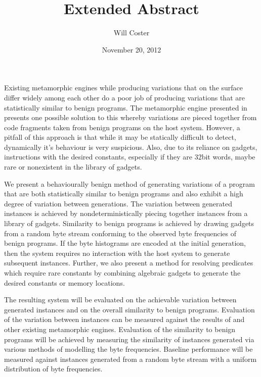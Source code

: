 \documentclass[finalcopy,short]{srpaper}
\title{Extended Abstract}
\author{Will Coster}
\date{November 20, 2012}
\begin{document}
  \frontmatter

  Existing metamorphic engines while producing variations that on the surface
  differ widely among each other do a poor job of producing variations that are
  statistically similar to benign programs. The metamorphic engine presented in
  \cite{franken} presents one possible solution to this whereby variations are
  pieced together from code fragments taken from benign programs on the host
  system. However, a pitfall of this approach is that while it may be statically
  difficult to detect, dynamically it's behaviour is very suspicious. Also, due
  to its reliance on gadgets, instructions with the desired constants,
  especially if they are 32bit words, maybe rare or nonexistent in the library
  of gadgets.

  We present a behaviourally benign method of generating variations of a program
  that are both statistically similar to benign programs and also exhibit a high
  degree of variation between generations. The variation between generated
  instances is achieved by nondeterministically piecing together instances from
  a library of gadgets. Similarity to benign programs is achieved by drawing
  gadgets from a random byte stream conforming to the observed byte frequencies
  of benign programs. If the byte histograms are encoded at the initial
  generation, then the system requires no interaction with the host system to
  generate subsequent instances. Further, we also present a method for resolving
  predicates which require rare constants by combining algebraic gadgets to
  generate the desired constants or memory locations. 

  The resulting system will be evaluated on the achievable variation between
  generated instances and on the overall similarity to benign programs.
  Evaluation of the variation between instances can be measured against the
  results of \cite{franken} and other existing metamorphic engines. Evaluation
  of the similarity to benign programs will be achieved by measuring the
  similarity of instances generated via various methods of modelling the byte
  frequencies. Baseline performance will be measured against instances generated
  from a random byte stream with a uniform distribution of byte frequencies.

\end{document}
